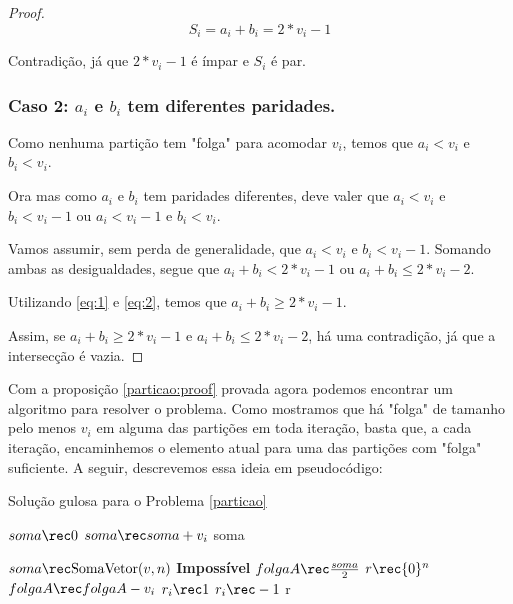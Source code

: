 \begin{proof}
$$S_i = a_i + b_i = 2*v_i - 1$$

Contradição, já que $2*v_i - 1$ é ímpar e $S_i$ é par.

\subsubsection*{Caso 2: $a_i$ e $b_i$ tem diferentes paridades.}

Como nenhuma partição tem "folga" para acomodar $v_i$, temos que $a_i < v_i$ e $b_i < v_i$.

Ora mas como $a_i$ e $b_i$ tem paridades diferentes, deve valer que $a_i < v_i$ e $b_i < v_i - 1$ ou $a_i < v_i - 1$ e $b_i < v_i$.

Vamos assumir, sem perda de generalidade, que $a_i < v_i$ e $b_i < v_i - 1$. Somando ambas as desigualdades, segue que $a_i + b_i < 2*v_i - 1$ ou $a_i + b_i \leq 2*v_i - 2$.

Utilizando \ref{eq:1} e \ref{eq:2}, temos que $a_i + b_i \geq 2*v_i - 1$.

Assim, se $a_i + b_i \geq 2*v_i - 1$ e $a_i + b_i \leq 2*v_i - 2$, há uma contradição, já que a intersecção é vazia.

\end{proof}

Com a proposição \ref{particao:proof} provada agora podemos encontrar um algoritmo para resolver o problema. Como mostramos que há "folga" de tamanho pelo menos $v_i$ em alguma das partições em toda iteração, basta que, a cada iteração, encaminhemos o elemento atual para uma das partições com "folga" suficiente. A seguir, descrevemos essa ideia em pseudocódigo:

\begin{algorithm}[h]
\caption{Solução gulosa para o Problema \ref{particao}}
\label{particao:code}
\begin{algorithmic}[1]
    \State $soma \rec 0$
        \State $soma \rec soma + v_i$
    \EndFor
    \State \Return soma
\EndFunction

    \State $soma \rec \text{SomaVetor}(v, n)$
        \State \Return \textbf{Impossível}
    \EndIf
    \State $folgaA \rec \frac{soma}{2}$
    \State $r \rec \{0\}^n$
            \State $folgaA \rec folgaA - v_i$
            \State $r_i \rec 1$
        \Else
            \State $r_i \rec -1$
        \EndIf
    \EndFor
    \State \Return r
\EndFunction
\end{algorithmic}
\end{algorithm}

